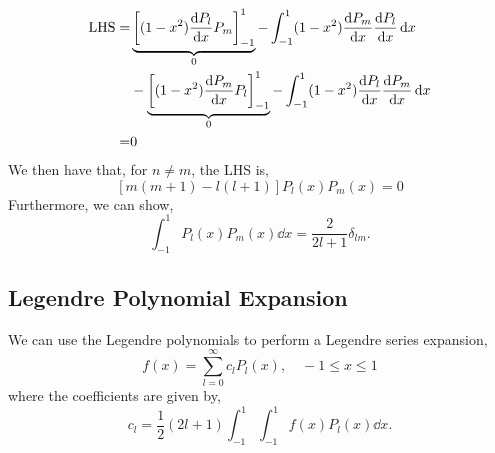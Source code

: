 \documentclass{book}
\begin{document}
\begin{equation}
	\begin{split}
		\text{LHS} = & \underbrace{\left[(1-x^2)\dv{P_l}{x}P_m\right]_{-1}^{1}}_0 - \int_{-1}^{1} (1-x^2) \dv{P_m}{x}  \dv{P_l}{x}\dd{x} \\
		& - \underbrace{\left[(1-x^2)\dv{P_m}{x}P_l\right]_{-1}^{1}}_0 - \int_{-1}^{1}(1-x^2)\dv{P_l}{x} \dv{P_m}{x}\dd{x} \\
		= & 0
	\end{split}
\end{equation}
We then have that, for $n\neq m$, the LHS is,
\begin{equation}
	\left[m(m+1)-l(l+1)\right]P_{l}(x)P_m(x) = 0
\end{equation}
Furthermore, we can show,
\begin{equation}
	\boxed{\int_{-1}^1 P_l(x)P_m(x) \dd{x} = \frac{2}{2l + 1}\delta_{lm}}.
\end{equation}
\subsection{Legendre Polynomial Expansion}
We can use the Legendre polynomials to perform a Legendre series expansion,
\begin{equation}
	f(x) = \sum_{l=0}^{\infty}c_lP_l(x), \hspace{1em} -1 \leq x \leq 1
\end{equation}
where the coefficients are given by,
\begin{equation}
	c_l = \frac{1}{2}(2l + 1)\int_{-1}^{1}\int_{-1}^{1}f(x)P_l(x)\dd{x}.
\end{equation}
\end{document}

